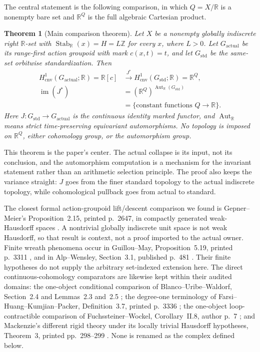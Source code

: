 \documentclass[11pt]{article}
\newtheorem{theorem}{Theorem}[section]
\theoremstyle{definition}
\newcommand{\R}{\mathbb R}
\newcommand{\Z}{\mathbb Z}
\newcommand{\Gactual}{G_{\mathrm{actual}}}
\newcommand{\Gstd}{G_{\mathrm{std}}}
\newcommand{\Hcnv}{H_{\mathrm{cnv}}}
\newcommand{\AutR}{\operatorname{Aut}_{\R}}
\newcommand{\Stab}{\operatorname{Stab}}
\newcommand{\im}{\operatorname{im}}
\begin{document}
The central statement is the following comparison, in which $Q=X/\R$ is a
nonempty bare set and $\R^Q$ is the full algebraic Cartesian product.

\begin{theorem}[Main comparison theorem]
\label{thm:main}
Let $X$ be a nonempty globally indiscrete right $\R$-set with
$\Stab_{\R}(x)=H=L\Z$ for every $x$, where $L>0$.  Let $\Gactual$ be its
range-first action groupoid with mark $c(x,t)=t$, and let $\Gstd$ be the
same-set orbitwise standardization.  Then
\begin{equation}
\label{eq:central-map}
\begin{aligned}
 \Hcnv^1(\Gactual;\R)=\R[c]
 &\xrightarrow{\ J^*\ }
 \Hcnv^1(\Gstd;\R)=\R^Q,\\
 \im(J^*)&=(\R^Q)^{\AutR(\Gstd)}\\
 &=\{\text{constant functions }Q\to\R\}.
\end{aligned}
\end{equation}
Here $J:\Gstd\to\Gactual$ is the continuous identity marked functor, and
$\AutR$ means strict time-preserving equivariant automorphisms.  No topology
is imposed on $\R^Q$, either cohomology group, or the automorphism group.
\end{theorem}

This theorem is the paper's center.  The actual collapse is its input, not
its conclusion, and the automorphism computation is a mechanism for the
invariant statement rather than an arithmetic selection principle.  The
proof also keeps the variance straight: $J$ goes from the finer standard
topology to the actual indiscrete topology, while cohomological pullback goes
from actual to standard.

The closest formal action-groupoid lift/descent comparison we found is
Gepner--Meier's Proposition~2.15, printed p.~2647, in compactly generated
weak-Hausdorff spaces \cite{GepnerMeier2023}.  A nontrivial globally
indiscrete unit space is not weak Hausdorff, so that result is context, not a
proof imported to the actual owner.  Finite wreath phenomena occur in
Guillou--May, Proposition~5.19, printed p.~3311
\cite{GuillouMay2017}, and in Alp--Wensley, Section~3.1, published p.~481
\cite{AlpWensley2010}.  Their finite hypotheses do not supply the arbitrary
set-indexed extension here.  The direct continuous-cohomology comparators
are likewise kept within their audited domains: the one-object conditional
comparison of Blanco--Uribe--Waldorf, Section~2.4 and Lemmas~2.3 and~2.5
\cite{BlancoUribeWaldorf2023}; the degree-one terminology of
Farsi--Huang--Kumjian--Packer, Definition~3.7, printed p.~3336
\cite{FarsiHuangKumjianPacker2022}; the one-object loop-contractible
comparison of Fuchssteiner--Wockel, Corollary~II.8, author p.~7
\cite{FuchssteinerWockel2012}; and Mackenzie's different rigid theory under
its locally trivial Hausdorff hypotheses, Theorem~3, printed pp.~298--299
\cite{Mackenzie1978}.  None is renamed as the complex defined below.
\end{document}
